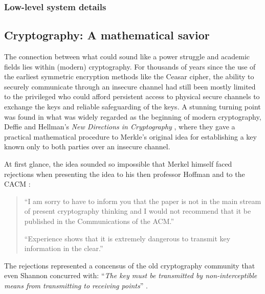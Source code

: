 \documentclass{article}
\begin{document}
\subsubsection{Low-level system details}

\subsection{Cryptography: A mathematical savior} \label{sec.crypto}
The connection between what could sound like a power struggle and academic
fields lies within (modern) cryptography. For thousands of years since the use
of the earliest symmetric encryption methods like the Ceasar cipher, the
ability to securely communicate through an insecure channel had still been
mostly limited to the privileged who could afford persistent access to physical
secure channels to exchange the keys and reliable safeguarding of the keys.
A stunning turning point was found in what was widely regarded as the beginning
of modern cryptography, Deffie and Hellman's \emph{New Directions in
Cryptography} \cite{new.directions.crypto}, where they gave a practical
mathematical procedure to Merkle's original idea for establishing a key known
only to both parties over an insecure channel.

At first glance, the idea sounded so impossible that Merkel himself faced 
rejections when presenting the idea to his then professor Hoffman and to the
CACM \cite{merkle.rejection}:
\begin{quotation}
	``I am sorry to have to inform you that the paper is not in the main stream
	of present cryptography thinking and I would not recommend that it be
	published in the Communications of the ACM.''

	``Experience shows that it is extremely dangerous to transmit key
	information in the clear.''\cite{merkle.rejection}
\end{quotation}
The rejections represented a concensus of the old cryptography community that
even Shannon concurred with: ``\emph{The key must be transmitted by
non-interceptible means from transmitting to receiving points}''
\cite[p.~670]{shannon.theory.secrecy}.
\end{document}
